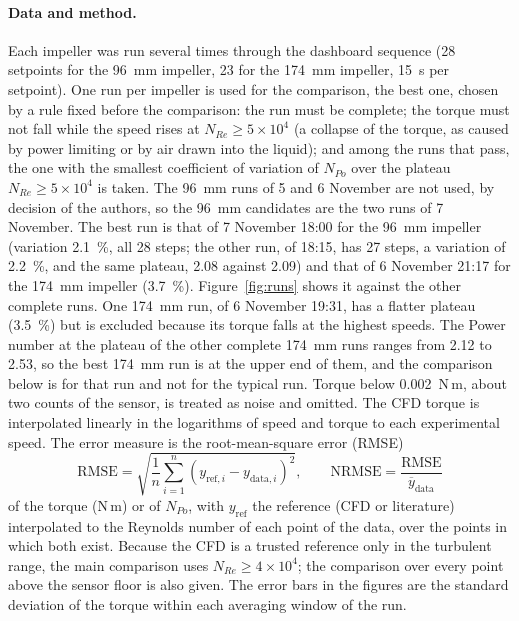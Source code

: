 \paragraph{Data and method.}
Each impeller was run several times through the dashboard sequence (28 setpoints for the 96~mm impeller, 23 for the 174~mm impeller, 15~s per setpoint). One run per impeller is used for the comparison, the best one, chosen by a rule fixed before the comparison: the run must be complete; the torque must not fall while the speed rises at $N_{Re} \geq 5\times10^{4}$ (a collapse of the torque, as caused by power limiting or by air drawn into the liquid); and among the runs that pass, the one with the smallest coefficient of variation of $N_{Po}$ over the plateau $N_{Re} \geq 5\times10^{4}$ is taken. The 96~mm runs of 5 and 6 November are not used, by decision of the authors, so the 96~mm candidates are the two runs of 7 November. The best run is that of 7 November 18:00 for the 96~mm impeller (variation 2.1~\%, all 28 steps; the other run, of 18:15, has 27 steps, a variation of 2.2~\%, and the same plateau, 2.08 against 2.09) and that of 6 November 21:17 for the 174~mm impeller (3.7~\%). Figure~\ref{fig:runs} shows it against the other complete runs. One 174~mm run, of 6 November 19:31, has a flatter plateau (3.5~\%) but is excluded because its torque falls at the highest speeds. The Power number at the plateau of the other complete 174~mm runs ranges from 2.12 to 2.53, so the best 174~mm run is at the upper end of them, and the comparison below is for that run and not for the typical run. %
Torque below 0.002~N\,m, about two counts of the sensor, is treated as noise and omitted. The CFD torque is interpolated linearly in the logarithms of speed and torque to each experimental speed. The error measure is the root-mean-square error (RMSE)
\begin{equation}
    \mathrm{RMSE} = \sqrt{\frac{1}{n}\sum_{i=1}^{n}\left(y_{\mathrm{ref},i} - y_{\mathrm{data},i}\right)^{2}}, \qquad \mathrm{NRMSE} = \frac{\mathrm{RMSE}}{\overline{y}_{\mathrm{data}}}
    \label{eq:rmse}
\end{equation}
of the torque (N\,m) or of $N_{Po}$, with $y_{\mathrm{ref}}$ the reference (CFD or literature) interpolated to the Reynolds number of each point of the data, over the points in which both exist. Because the CFD is a trusted reference only in the turbulent range, the main comparison uses $N_{Re} \geq 4\times10^{4}$; the comparison over every point above the sensor floor is also given. The error bars in the figures are the standard deviation of the torque within each averaging window of the run.


